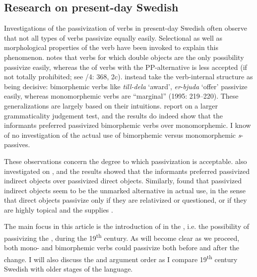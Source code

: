 \documentclass[output=paper]{langscibook}
\begin{document}
\subsection{Research on present-day Swedish}\label{sec:falk:2.1}


Investigations of the passivization of  verbs in present-day Swedish often observe that not all types of  verbs passivize equally easily. Selectional as well as morphological properties of the verb have been invoked to explain this phenomenon. \citet{Anward1989} notes that verbs for which double objects are the only possibility passivize easily, whereas the  of verbs with the PP-alternative is less accepted (if not totally prohibited; see \citealt{TelemanEtAl1999}/4: 368, 2c). \citet{HolmbergPlatzack1995} instead take the verb-internal structure as being decisive: bimorphemic  verbs like \textit{till-dela} ‘award’, \textit{er}{}-\textit{bjuda} ‘offer’ passivize easily, whereas  monomorphemic  verbs are “marginal” (1995: 219–220). These generalizations are largely based on their intuitions. \citet{HaddicanHolmberg2019} report on a larger grammaticality judgement test, and the results do indeed show that the informants preferred passivized bimorphemic verbs over monomorphemic. I know of no investigation of the actual use of bimorphemic versus monomorphemic  \textit{s}{}-passives.


These observations concern the degree to which passivization is acceptable. \citet{HaddicanHolmberg2019} also investigated  on , and the results showed that the informants preferred passivized indirect objects over passivized direct objects. Similarly, \citet{Lundquist2004} found that passivized indirect objects seem to be the unmarked alternative in actual use, in the sense that direct objects passivize only if they are relativized or questioned, or if they are highly topical and the  supplies .



The main focus in this article is the introduction of  in the , i.e. the possibility of passivizing the , during the 19\textsuperscript{th} century. As will become clear as we proceed, both mono- and bimorphemic  verbs could passivize both before and after the change. I will also discuss the  and argument order as I compare 19\textsuperscript{th} century Swedish with older stages of the language.
\end{document}

